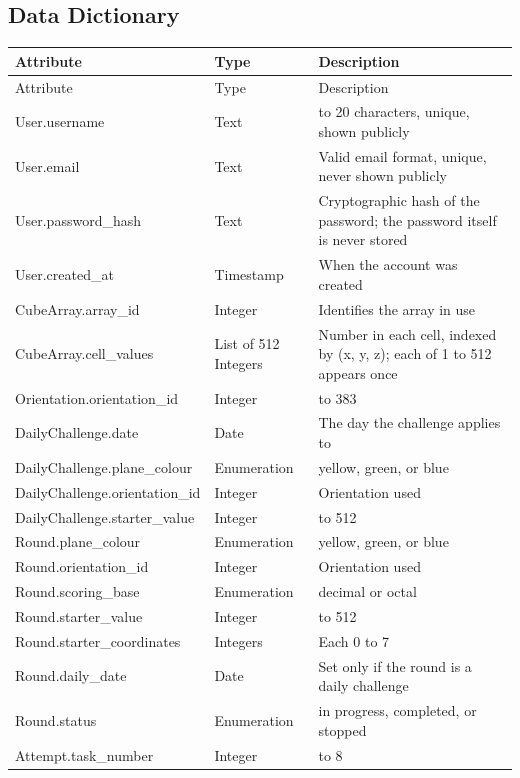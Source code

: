 \documentclass[12pt]{article}
\begin{document}
\subsection{Data Dictionary}
 
{\small
\begin{longtable}{>{\raggedright\arraybackslash}p{} >{\raggedright\arraybackslash}p{} >{\raggedright\arraybackslash}p{}}
\toprule
Attribute & Type & Description\\
\midrule
\endfirsthead
\toprule
Attribute & Type & Description\\
\midrule
\endhead
User.username & Text & 3 to 20 characters, unique, shown publicly\\
User.email & Text & Valid email format, unique, never shown publicly\\
User.password\_hash & Text & Cryptographic hash of the password; the password itself is never stored\\
User.created\_at & Timestamp & When the account was created\\
CubeArray.array\_id & Integer & Identifies the array in use\\
CubeArray.cell\_values & List of 512 Integers & Number in each cell, indexed by (x, y, z); each of 1 to 512 appears once\\
Orientation.orientation\_id & Integer & 0 to 383\\
DailyChallenge.date & Date & The day the challenge applies to\\
DailyChallenge.plane\_colour & Enumeration & yellow, green, or blue\\
DailyChallenge.orientation\_id & Integer & Orientation used\\
DailyChallenge.starter\_value & Integer & 1 to 512\\
Round.plane\_colour & Enumeration & yellow, green, or blue\\
Round.orientation\_id & Integer & Orientation used\\
Round.scoring\_base & Enumeration & decimal or octal\\
Round.starter\_value & Integer & 1 to 512\\
Round.starter\_coordinates & 3 Integers & Each 0 to 7\\
Round.daily\_date & Date & Set only if the round is a daily challenge\\
Round.status & Enumeration & in progress, completed, or stopped\\
Attempt.task\_number & Integer & 1 to 8\\

\end{longtable}}
\end{document}
